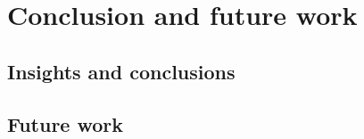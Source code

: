 \chapter{Conclusion and future work}
\label{sec:conclusion_and_future_work}

\section{Insights and conclusions}
\label{insights_and_conclusions}

\section{Future work}
\label{future_work}
